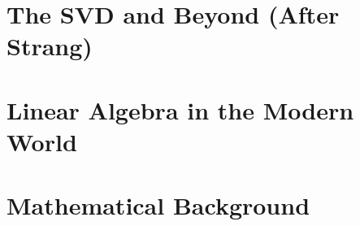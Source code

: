\documentclass[11pt]{book}
\begin{document}
\part{The SVD and Beyond (After Strang)}





\part{Linear Algebra in the Modern World}






\part{Mathematical Background}


\end{document}
